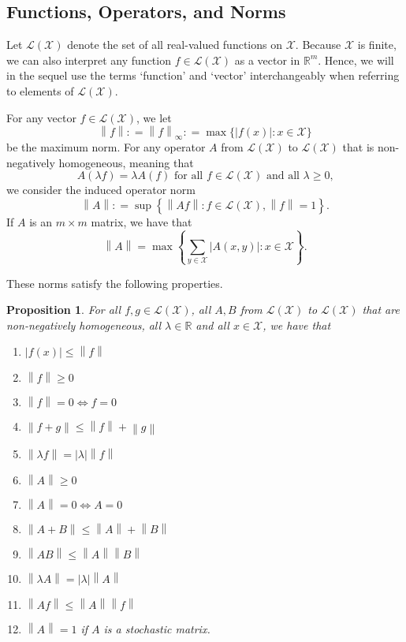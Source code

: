 \documentclass[10pt]{paper}
\newtheorem{proposition}[theorem]{Proposition}
\newcommand{\reals}{\mathbb{R}}
\newcommand{\states}{\mathcal{X}}
\newcommand{\gambles}{\mathcal{L}}
\newcommand{\gamblesX}{\gambles(\states)}
\newcommand{\asa}{\Leftrightarrow}
\newcommand{\norm}[1]{\left\lVert #1 \right\rVert}
\newcommand{\abs}[1]{\left\vert #1 \right\vert}
\newcommand{\coloneqq}{:\!=}
\begin{document}
\subsection{Functions, Operators, and Norms}
Let $\gamblesX$ denote the set of all real-valued functions on $\states$. Because $\states$ is finite, we can also interpret any function $f\in\gamblesX$ as a vector in $\reals^m$. Hence, we will in the sequel use the terms `function' and `vector' interchangeably when referring to elements of $\gamblesX$.

For any vector $f\in\gamblesX$, we let
\begin{equation*}
\norm{f}\coloneqq\norm{f}_{\infty}\coloneqq\max\{\abs {f(x)}\colon x\in\states\}
\end{equation*}
be the maximum norm. For any operator $A$ from $\gamblesX$ to $\gamblesX$ that is non-negatively homogeneous, meaning that
\begin{equation*}
A(\lambda f)=\lambda A(f)\text{ for all $f\in\gamblesX$ and all $\lambda\geq0$,}
\end{equation*}
we consider the induced operator norm
\begin{equation*}
\norm{A}\coloneqq\sup\left\{\norm{Af}\colon f\in\gamblesX,\norm{f}=1\right\}.
\end{equation*}
If $A$ is an $m\times m$ matrix, we have that
\begin{equation*}
\norm{A}
=
\max\left\{\sum_{y\in\states}\abs{A(x,y)}\colon x\in\states\right\}.
\end{equation*}

\noindent
These norms satisfy the following properties. 

\begin{proposition}
For all $f,g\in\gamblesX$, all $A,B$ from $\gamblesX$ to $\gamblesX$ that are non-negatively homogeneous, all $\lambda\in\reals$ and all $x\in\states$, we have that
\vspace{5pt}

\begin{enumerate}[label=N\arabic*:]
\item
$\abs{f(x)}\leq\norm{f}$
\item
$\norm{f}\geq0$
\item
$\norm{f}=0\asa f=0$
\item
$\norm{f+g}\leq\norm{f}+\norm{g}$
\item
$\norm{\lambda f}=\abs{\lambda}\norm{f}$
\item
$\norm{A}\geq0$
\item
$\norm{A}=0\asa A=0$
\item
$\norm{A+B}\leq\norm{A}+\norm{B}$
\item
$\norm{AB}\leq\norm{A}\norm{B}$
\item
$\norm{\lambda A}=\abs{\lambda}\norm{A}$
\item
$\norm{Af}\leq\norm{A}\norm{f}$
\item
$\norm{A}=1$ if $A$ is a stochastic matrix.
\end{enumerate}
\vspace{5pt}
\end{proposition}
\end{document}
